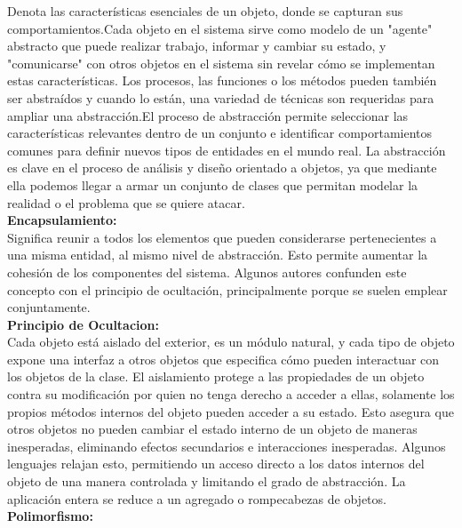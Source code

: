 \begin{enumerate}[1.]
Denota las características esenciales de un objeto, donde se capturan sus comportamientos.Cada objeto en el sistema sirve como modelo de un "agente" abstracto que puede realizar trabajo, informar y cambiar su estado, y "comunicarse" con otros objetos en el sistema sin revelar cómo se implementan estas características. Los procesos, las funciones o los métodos pueden también ser abstraídos y cuando lo están, una variedad de técnicas son requeridas para ampliar una abstracción.El proceso de abstracción permite seleccionar las características relevantes dentro de un conjunto e identificar comportamientos comunes para definir nuevos tipos de entidades en el mundo real. La abstracción es clave en el proceso de análisis y diseño orientado a objetos, ya que mediante ella podemos llegar a armar un conjunto de clases que permitan modelar la realidad o el problema que se quiere atacar.\\

\textbf{Encapsulamiento:}\\

Significa reunir a todos los elementos que pueden considerarse pertenecientes a una misma entidad, al mismo nivel de abstracción. Esto permite aumentar la cohesión de los componentes del sistema. Algunos autores confunden este concepto con el principio de ocultación, principalmente porque se suelen emplear conjuntamente.\\


\textbf{Principio de Ocultacion:}\\

Cada objeto está aislado del exterior, es un módulo natural, y cada tipo de objeto expone una interfaz a otros objetos que especifica cómo pueden interactuar con los objetos de la clase. El aislamiento protege a las propiedades de un objeto contra su modificación por quien no tenga derecho a acceder a ellas, solamente los propios métodos internos del objeto pueden acceder a su estado. Esto asegura que otros objetos no pueden cambiar el estado interno de un objeto de maneras inesperadas, eliminando efectos secundarios e interacciones inesperadas. Algunos lenguajes relajan esto, permitiendo un acceso directo a los datos internos del objeto de una manera controlada y limitando el grado de abstracción. La aplicación entera se reduce a un agregado o rompecabezas de objetos.\\


\textbf{Polimorfismo:}\\


\end{enumerate}
